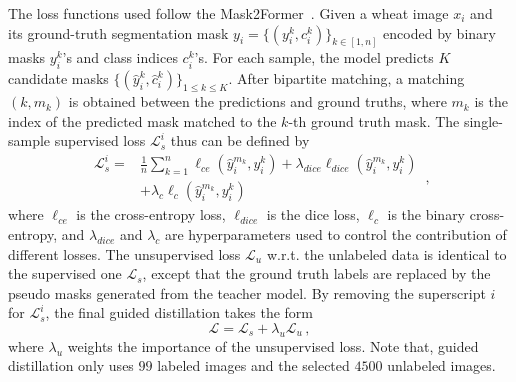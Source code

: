 The loss functions used follow the Mask2Former~\cite{he2022masked}. Given a wheat image $x_i$ and its ground-truth segmentation mask $y_i=\{(y_i^k,c_i^k)\}_{k\in[1,n]}$ encoded by binary masks $y_i^k$'s and class indices $c_i^k$'s. For each sample, the model predicts $K$ candidate masks $\{(\hat{y}_i^k, \hat{c}_i^k)\}_{1\leq k \leq K }$. After bipartite matching, a matching $(k, m_k)$ is obtained between the predictions and ground truths, where $m_k$ is the index of the predicted mask matched to the $k$-th ground truth mask. The single-sample supervised loss $\mathcal{L}_s^i$ thus can be defined by
\begin{equation}
\begin{aligned}
    \mathcal{L}_s^i=&\frac{1}{n}\sum_{k=1}^{n} \ell_{ce}(\hat{y}_i^{m_k}, y_i^k) +\lambda_{dice} \ell_{dice}(\hat{y}_i^{m_k}, y_i^k) \\
    &+\lambda_{c}\ell_{c}(\hat{y}_i^{m_k}, y_i^k)
\end{aligned}\,,
\end{equation}
where $\ell_{ce}$ is the cross-entropy loss, $\ell_{dice}$ is the dice loss, $\ell_{c}$ is the binary cross-entropy, and $\lambda_{dice}$ and $\lambda_{c}$ are hyperparameters used to control the contribution of different losses. %
The unsupervised loss $\mathcal{L}_u$ w.r.t. the unlabeled data is identical to the supervised one $\mathcal{L}_s$, except that the ground truth labels are replaced by the pseudo masks generated from the teacher model. By removing the superscript $i$ for $\mathcal{L}_s^i$, the final guided distillation takes the form
\begin{equation}
    \mathcal{L} = \mathcal{L}_s+\lambda_u\mathcal{L}_u\,,
\end{equation}
where %
$\lambda_u$ weights the importance of the %
unsupervised loss. Note that, guided distillation only uses $99$ labeled images and the selected $4500$ unlabeled images.


